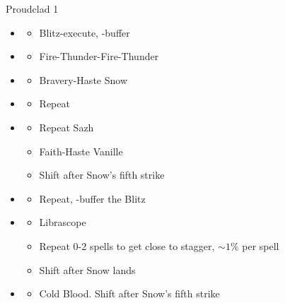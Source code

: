 \begin{multicols}{2}
\begin{battle}{Proudclad 1}
  \begin{itemize}
    \item \second
          \begin{itemize}
            \item Blitz-execute, \rav-buffer
          \end{itemize}
    \item \sixth
          \begin{itemize}
            \item Fire-Thunder-Fire-Thunder
          \end{itemize}
    \item \fourth
          \begin{itemize}
            \item Bravery-Haste Snow
          \end{itemize}
    \item \sixth
          \begin{itemize}
            \item Repeat
          \end{itemize}
    \item \fourth
          \begin{itemize}
            \item Repeat Sazh
            \item Faith-Haste Vanille
            \item Shift after Snow's fifth strike
          \end{itemize}
    \item \first
          \begin{itemize}
            \item Repeat, \rav-buffer the Blitz
          \end{itemize}
    \item \fifth
          \begin{itemize}
            \item Librascope
            \item Repeat 0-2 spells to get close to stagger, $\sim1\%$ per spell
            \item Shift after Snow lands
          \end{itemize}
    \item \sixth
          \begin{itemize}
            \item Cold Blood. Shift after Snow's fifth strike
          \end{itemize}

\end{itemize}
\end{battle}
\end{multicols}
